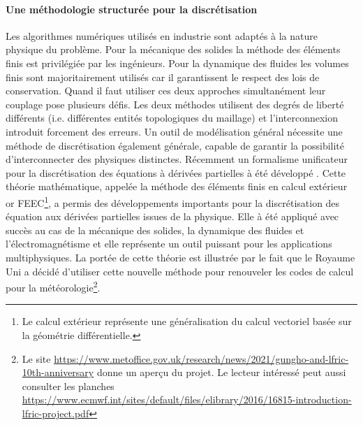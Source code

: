 \documentclass[12pt, french]{article}
\begin{document}
	\paragraph{\large Une méthodologie structurée pour la discrétisation \\}
	Les algorithmes numériques utilisés en industrie sont adaptés à la nature physique du problème. Pour la mécanique des solides la méthode des éléments finis est privilégiée par les ingénieurs. Pour la dynamique des fluides les volumes finis sont majoritairement utilisés car il garantissent le respect des lois de conservation. Quand il faut utiliser ces deux approches simultanément leur couplage pose plusieurs défis. Les deux méthodes utilisent des degrés de liberté différents (i.e. différentes entités topologiques du maillage) et l'interconnexion introduit forcement des erreurs. Un outil de modélisation général nécessite une méthode de discrétisation également générale, capable de  garantir la possibilité d'interconnecter des physiques distinctes. Récemment un formalisme unificateur pour la discrétisation des équations à dérivées partielles  à été développé  \cite{arnold2006acta}. Cette théorie mathématique, appelée la méthode des éléments finis en calcul extérieur or FEEC\footnote{Le calcul extérieur représente une généralisation du calcul vectoriel basée sur la géométrie différentielle.}, a permis des développements importants pour la discrétisation des équation aux dérivées partielles issues de la physique. Elle à été appliqué avec succès au cas de la mécanique des solides, la dynamique des fluides et l'électromagnétisme et elle représente un outil puissant pour les applications multiphysiques. La portée de cette théorie est illustrée par le fait que le Royaume Uni a décidé d'utiliser cette nouvelle méthode pour renouveler les codes de calcul pour la météorologie\footnote{Le site \url{https://www.metoffice.gov.uk/research/news/2021/gungho-and-lfric-10th-anniversary} donne un aperçu du projet. Le lecteur intéressé peut aussi consulter les planches  \url{https://www.ecmwf.int/sites/default/files/elibrary/2016/16815-introduction-lfric-project.pdf}}.
	
\end{document}
